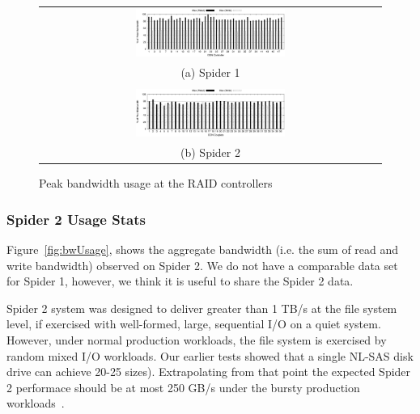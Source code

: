 \begin{figure}[!thb]
\begin{center}
\begin{tabular}{c}
{\includegraphics[width=0.450\textwidth]{./figs/spider1-bw-perc-max.eps}}\\
{(a) Spider 1}\\
\\
{\includegraphics[width=0.450\textwidth]{./figs/spider2-bw-perc-max.eps}}\\
{(b) Spider 2}\\
\end{tabular}
\vspace{-0.1in}
\caption{Peak bandwidth usage at the RAID controllers}
\label{fig:ddnpeakBW}
\end{center}
\end{figure}

\subsubsection{Spider 2 Usage Stats}

Figure~\ref{fig:bwUsage}, shows the aggregate bandwidth (i.e. the sum of read
and write bandwidth) observed on Spider 2. We do not have a comparable data set
for Spider 1, however, we think it is useful to share the Spider 2 data. 

Spider 2 system was designed to deliver greater than 1 TB/s at the file system level, 
if exercised with well-formed, large, sequential I/O on a quiet system. However, under
normal production workloads, the file system is exercised by random mixed I/O
workloads. Our earlier tests showed that a single NL-SAS disk drive can achieve
20-25%
sizes). Extrapolating from that point the expected Spider 2 performace should be 
at most 250 GB/s under the bursty production workloads~\cite{bestpractices}.


